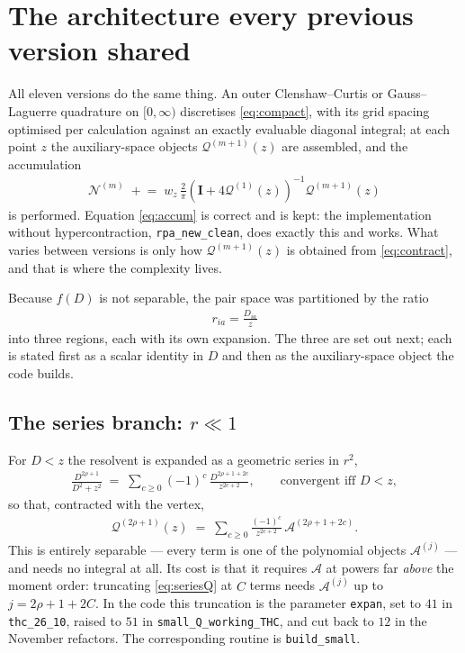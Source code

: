 \documentclass[11pt]{article}
\newcommand{\mat}[1]{{\mathbf{#1}}}
\newcommand{\parth}[1]{\left(#1\right)}
\newcommand{\Dcal}{\mathcal{A}}
\newcommand{\Qcal}{\mathcal{Q}}
\newcommand{\Ncal}{\mathcal{N}}
\newcommand{\code}[1]{\texttt{\small #1}}
\begin{document}
\section{The architecture every previous version shared}

All eleven versions do the same thing. An outer Clenshaw--Curtis or Gauss--Laguerre
quadrature on $[0,\infty)$ discretises \eqref{eq:compact}, with its grid spacing optimised
per calculation against an exactly evaluable diagonal integral; at each point $z$ the
auxiliary-space objects $\Qcal^{(m+1)}(z)$ are assembled, and the accumulation
\begin{align}
    \Ncal^{(m)} \;\mathrel{+}= \; w_z \,\frac{2}{\pi}
    \parth{\mat{I} + 4\Qcal^{(1)}(z)}^{-1} \Qcal^{(m+1)}(z)
    \label{eq:accum}
\end{align}
is performed. Equation \eqref{eq:accum} is correct and is kept: the implementation
without hypercontraction, \code{rpa\_new\_clean}, does exactly this and works. What varies between
versions is only how $\Qcal^{(m+1)}(z)$ is obtained from \eqref{eq:contract}, and that is
where the complexity lives.

Because $f(D)$ is not separable, the pair space was partitioned by the ratio
\begin{align}
    r_{ia} = \frac{D_{ia}}{z}
\end{align}
into three regions, each with its own expansion. The three are set out next; each is stated
first as a scalar identity in $D$ and then as the auxiliary-space object the code builds.

\subsection{\texorpdfstring{The series branch: $r \ll 1$}{The series branch: r much less than 1}}

For $D < z$ the resolvent is expanded as a geometric series in $r^2$,
\begin{align}
    \frac{D^{2\rho+1}}{D^2+z^2}
    \;=\; \sum_{c \ge 0} (-1)^c \, \frac{D^{2\rho+1+2c}}{z^{2c+2}} ,
    \qquad \text{convergent iff } D < z ,
    \label{eq:series}
\end{align}
so that, contracted with the vertex,
\begin{align}
    \Qcal^{(2\rho+1)}(z) \;=\; \sum_{c \ge 0} \frac{(-1)^c}{z^{2c+2}}\, \Dcal^{(2\rho+1+2c)} .
    \label{eq:seriesQ}
\end{align}
This is entirely separable --- every term is one of the polynomial objects
$\Dcal^{(j)}$ --- and needs no integral at all. Its cost is that it requires $\Dcal$ at
powers far \emph{above} the moment order: truncating \eqref{eq:seriesQ} at $C$ terms needs
$\Dcal^{(j)}$ up to $j = 2\rho + 1 + 2C$. In the code this truncation is the parameter
\code{expan}, set to $41$ in \code{thc\_26\_10}, raised to $51$ in
\code{small\_Q\_working\_THC}, and cut back to $12$ in the November refactors. The
corresponding routine is \code{build\_small}.
\end{document}
